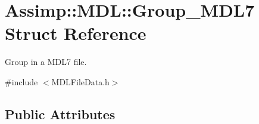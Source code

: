 \hypertarget{struct_assimp_1_1_m_d_l_1_1_group___m_d_l7}{\section{Assimp\+:\+:M\+D\+L\+:\+:Group\+\_\+\+M\+D\+L7 Struct Reference}
\label{struct_assimp_1_1_m_d_l_1_1_group___m_d_l7}
}


Group in a M\+D\+L7 file.  




{\ttfamily \#include $<$M\+D\+L\+File\+Data.\+h$>$}

\subsection*{Public Attributes}
